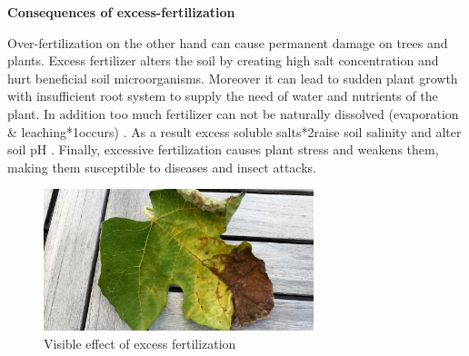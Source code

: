 \documentclass{article}
\begin{document}
{                \textbf{Consequences of excess-fertilization }\par
                Over-fertilization on the other hand can cause permanent damage on trees and plants. Excess fertilizer alters the soil by creating high salt concentration and hurt beneficial soil microorganisms. Moreover it can lead to sudden plant growth with insufficient root system to supply the need of water and nutrients of the plant. In addition too much fertilizer can not be naturally dissolved (evaporation & leaching*1occurs) . As a result excess soluble salts*2raise soil salinity and alter soil pH . Finally, excessive fertilization causes plant stress and weakens them, making them susceptible to diseases and insect attacks.\par
                
                \begin{figure}[h]
                    \centering
                    \includegraphics[width=0.7\textwidth]{Figures/excess fertilization.jpg}
                    \caption{Visible effect of excess fertilization}
                    \label{fig:my_label}
                \end{figure}
                
}
\end{document}

